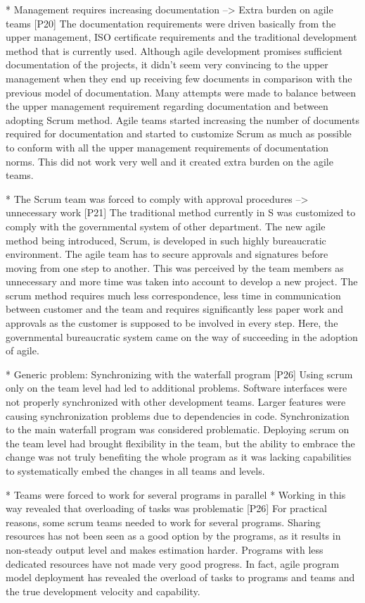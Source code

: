 \documentclass[preprint,authoryear,12pt]{elsarticle}
\begin{document}
* Management requires increasing documentation --> Extra burden on agile teams
[P20]
The documentation requirements were driven basically from the upper management,
ISO certificate requirements and the traditional development method that is
currently used. Although agile development promises sufficient documentation of
the projects, it didn’t seem very convincing to the upper management when they
end up receiving few documents in comparison with the previous model of
documentation.
Many attempts were made to balance between the upper management requirement
regarding documentation and between adopting Scrum method. Agile teams started
increasing the number of documents required for documentation and started to
customize Scrum as much as possible to conform with all the upper management
requirements of documentation norms.
This did not work very well and it created extra burden on the agile teams.


* The Scrum team was forced to comply with approval procedures --> unnecessary work
[P21]
The traditional method currently in S was customized to comply with the
governmental system of other department. The new agile method being introduced,
Scrum, is developed in such highly bureaucratic environment. The agile team has
to secure approvals and signatures before moving from one step to another. This
was perceived by the team members as unnecessary and more time was taken into
account to develop a new project.
The scrum method requires much less correspondence, less time in communication
between customer and the team and requires significantly less paper work and
approvals as the customer is supposed to be involved in every step. Here, the
governmental bureaucratic system came on the way of succeeding in the adoption
of agile.


* Generic problem: Synchronizing with the waterfall program
[P26]
Using scrum only on the team level had led to additional problems. Software
interfaces were not properly synchronized with other development teams.
Larger features were causing synchronization problems due to dependencies in
code. Synchronization to the main waterfall program was considered problematic.
Deploying scrum on the team level had brought flexibility in the team, but the
ability to embrace the change was not truly benefiting the whole program as it
was lacking capabilities to systematically embed the changes in all teams and
levels.


* Teams were forced to work for several programs in parallel
* Working in this way revealed that overloading of tasks was problematic
[P26]
For practical reasons, some scrum teams needed to work for several programs.
Sharing resources has not been seen as a good option by the programs, as it
results in non-steady output level and makes estimation harder.
Programs with less dedicated resources have not made very good progress. In
fact, agile program model deployment has revealed the overload of tasks to
programs and teams and the true development velocity and capability.
\end{document}
